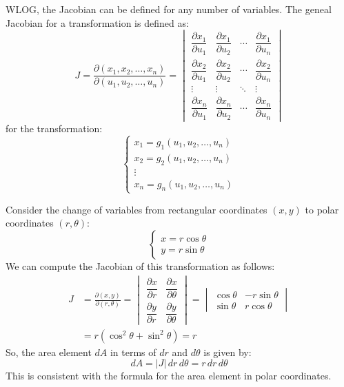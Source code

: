 \documentclass[11pt]{report}
\begin{document}
\begin{definition}
    WLOG, the Jacobian can be defined for any number of variables. The geneal Jacobian for a transformation is defined as:
    \begin{equation}
        J = \frac{\partial(x_1, x_2, \ldots, x_n)}{\partial(u_1, u_2, \ldots, u_n)} = \begin{vmatrix}
            \dfrac{\partial x_1}{\partial u_1} & \dfrac{\partial x_1}{\partial u_2} & \cdots & \dfrac{\partial x_1}{\partial u_n} \\
            \dfrac{\partial x_2}{\partial u_1} & \dfrac{\partial x_2}{\partial u_2} & \cdots & \dfrac{\partial x_2}{\partial u_n} \\
            \vdots & \vdots & \ddots & \vdots \\
            \dfrac{\partial x_n}{\partial u_1} & \dfrac{\partial x_n}{\partial u_2} & \cdots & \dfrac{\partial x_n}{\partial u_n}
        \end{vmatrix}
    \end{equation}
    for the transformation:
    $$
    \begin{cases}
        x_1 = g_1(u_1, u_2, \ldots, u_n) \\
        x_2 = g_2(u_1, u_2, \ldots, u_n) \\
        \vdots \\
        x_n = g_n(u_1, u_2, \ldots, u_n)
    \end{cases}
    $$
\end{definition}

\begin{example}
    Consider the change of variables from rectangular coordinates $(x,y)$ to polar coordinates $(r,\theta)$:
    $$
    \begin{cases}
        x = r \cos \theta \\
        y = r \sin \theta
    \end{cases}
    $$
    We can compute the Jacobian of this transformation as follows:
    \begin{align*}
        J &= \frac{\partial(x,y)}{\partial(r,\theta)} = \begin{vmatrix}
            \dfrac{\partial x}{\partial r} & \dfrac{\partial x}{\partial \theta} \\
            \dfrac{\partial y}{\partial r} & \dfrac{\partial y}{\partial \theta}
        \end{vmatrix} = \begin{vmatrix}
            \cos \theta & -r \sin \theta \\
            \sin \theta & r \cos \theta
        \end{vmatrix} \\
        &= r (\cos^2 \theta + \sin^2 \theta) = r
    \end{align*}
    So, the area element $dA$ in terms of $dr$ and $d\theta$ is given by:
    $$        
        dA = |J| \, dr \, d\theta = r \, dr \, d\theta
    $$
    This is consistent with the formula for the area element in polar coordinates.
\end{example}
\end{document}
